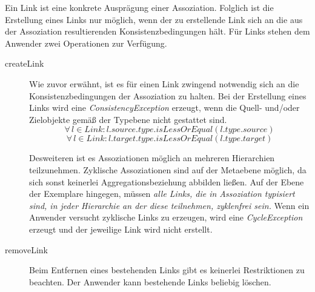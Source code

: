 Ein Link ist eine konkrete Ausprägung einer Assoziation. Folglich ist die Erstellung eines Links nur möglich, wenn der zu erstellende Link sich an die aus der Assoziation resultierenden Konsistenzbedingungen hält. Für Links stehen dem Anwender zwei Operationen zur Verfügung.

\begin{description}
\item[createLink]
Wie zuvor erwähnt, ist es für einen Link zwingend notwendig sich an die Konsistenzbedingungen der Assoziation zu halten.
Bei der Erstellung eines Links wird eine \emph{ConsistencyException} erzeugt, wenn die Quell- und/oder Zielobjekte gemäß der Typebene nicht 
gestattet sind.
\begin{equation} \forall \, l \in Link: l.source.type.isLessOrEqual(l.type.source)
\end{equation} 
\begin{equation} \forall \, l \in Link: l.target.type.isLessOrEqual(l.type.target)
\end{equation}

Desweiteren ist es Assoziationen möglich an mehreren Hierarchien teilzunehmen. Zyklische Assoziationen sind auf der Metaebene möglich, 
da sich sonst keinerlei Aggregationsbeziehung abbilden ließen.
Auf der Ebene der Exemplare hingegen, müssen \emph{alle Links, die in Assoziation typisiert sind, in jeder Hierarchie an der diese teilnehmen, zyklenfrei sein.}
Wenn ein Anwender versucht zyklische Links zu erzeugen, wird eine \emph{CycleException} erzeugt und der jeweilige Link wird nicht erstellt.
\item[removeLink]
Beim Entfernen eines bestehenden Links gibt es keinerlei Restriktionen zu beachten. Der Anwender kann bestehende Links beliebig löschen.
\end{description}